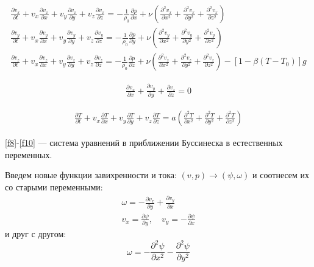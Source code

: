 \documentclass[a4paper, 12pt]{article}
\newcommand{\der}[2]{\frac{\partial {#1}}{\partial {#2}}}
\newcommand{\dder}[2]{\frac{\partial^2 {#1}}{\partial {#2}^2}}
\begin{document}
    \begin{equation}
    \begin{gathered}
    \label{f8}
    \frac{\partial v_x}{\partial t} + v_x\frac{\partial v_x}{\partial x} + v_y\frac{\partial v_x}{\partial y} + v_z \frac{\partial v_x}{\partial z} = -\frac{1}{\rho_0}\frac{\partial p}{\partial x} + \nu \left(\frac{\partial^2 v_x}{\partial x^2} + \frac{\partial^2 v_x}{\partial y^2} + \frac{\partial^2 v_x}{\partial z^2}\right)\\
    \frac{\partial v_y}{\partial t} + v_x\frac{\partial v_y}{\partial x} + v_y\frac{\partial v_y}{\partial y} + v_z \frac{\partial v_y}{\partial z} = -\frac{1}{\rho_0}\frac{\partial p}{\partial y} + \nu \left(\frac{\partial^2 v_y}{\partial x^2} + \frac{\partial^2 v_y}{\partial y^2} + \frac{\partial^2 v_y}{\partial z^2}\right)\\
    \frac{\partial v_z}{\partial t} + v_x\frac{\partial v_z}{\partial x} + v_y\frac{\partial v_z}{\partial y} + v_z \frac{\partial v_z}{\partial z} = -\frac{1}{\rho_0}\frac{\partial p}{\partial z} + \nu \left(\frac{\partial^2 v_z}{\partial x^2} + \frac{\partial^2 v_z}{\partial y^2} + \frac{\partial^2 v_z}{\partial z^2}\right) - [1-\beta(T-T_0)]g
    \end{gathered}
    \end{equation}

    \begin{equation}
    \begin{gathered}
    \label{f9}
    \frac{\partial v_x}{\partial x} + \frac{\partial v_y}{\partial y} + \frac{\partial v_z}{\partial z} =0
    \end{gathered}
    \end{equation}

    \begin{equation}
    \begin{gathered}
    \label{f10}
    \frac{\partial T}{\partial t} + v_x \frac{\partial T}{\partial x}+ v_y \frac{\partial T}{\partial y} + v_z \frac{\partial T}{\partial z} = a(\frac{\partial^2 T}{\partial x^2} + \frac{\partial^2 T}{\partial y^2} + \frac{\partial^2 T}{\partial z^2})
    \end{gathered}
    \end{equation}

    \eqref{f8}-\eqref{f10} --- система уравнений в приближении Буссинеска в естественных переменных.

    Введем новые функции завихренности и тока: $(v,p) \to (\psi, \omega)$ и
    соотнесем их со старыми переменными:
    \begin{gather*}
      \omega = - \der{v_x}{y} + \der{v_y}{x}
      \\
      v_x = \der{\psi}{y}, \quad v_y = - \der{\psi}{x}
    \end{gather*}
    и друг с другом:
    $$
      \omega = - \dder{\psi}{x} - \dder{\psi}{y}
    $$
\end{document}
